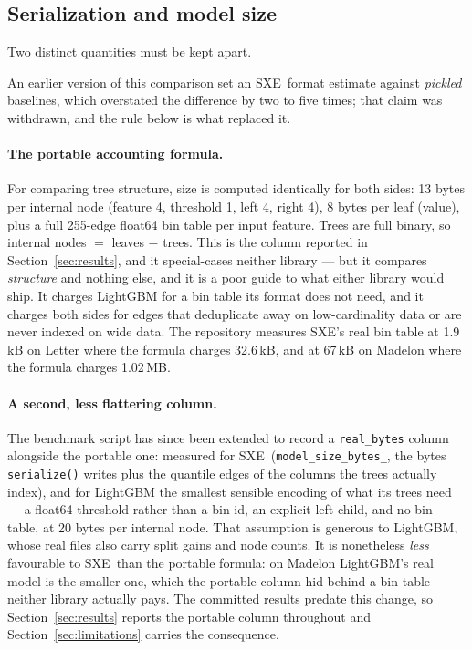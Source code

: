 \documentclass[11pt,a4paper]{article}
\newcommand{\code}[1]{\texttt{\small #1}}
\newcommand{\SXE}{\textsc{SXE}}
\theoremstyle{definition}
\begin{document}
\subsection{Serialization and model size}\label{sec:size}

Two distinct quantities must be kept apart.

An earlier version of this comparison set an \SXE\ format estimate against
\emph{pickled} baselines, which overstated the difference by two to five times;
that claim was withdrawn, and the rule below is what replaced it.

\paragraph{The portable accounting formula.} For comparing tree structure, size
is computed identically for both sides: 13 bytes per internal node (feature 4,
threshold 1, left 4, right 4), 8 bytes per leaf (value), plus a full 255-edge
float64 bin table per input feature. Trees are full binary, so internal nodes
$=$ leaves $-$ trees. This is the column reported in Section~\ref{sec:results},
and it special-cases neither library --- but it compares \emph{structure} and
nothing else, and it is a poor guide to what either library would ship. It
charges LightGBM for a bin table its format does not need, and it charges both
sides for edges that deduplicate away on low-cardinality data or are never
indexed on wide data. The repository measures \SXE's real bin table at 1.9\,kB
on Letter where the formula charges 32.6\,kB, and at 67\,kB on Madelon where the
formula charges 1.02\,MB.

\paragraph{A second, less flattering column.} The benchmark script has since
been extended to record a \code{real\_bytes} column alongside the portable one:
measured for \SXE\ (\code{model\_size\_bytes\_}, the bytes \code{serialize()}
writes plus the quantile edges of the columns the trees actually index), and for
LightGBM the smallest sensible encoding of what its trees need --- a float64
threshold rather than a bin id, an explicit left child, and no bin table, at 20
bytes per internal node. That assumption is generous to LightGBM, whose real
files also carry split gains and node counts. It is nonetheless \emph{less}
favourable to \SXE\ than the portable formula: on Madelon LightGBM's real model
is the smaller one, which the portable column hid behind a bin table neither
library actually pays. The committed results predate this change, so
Section~\ref{sec:results} reports the portable column throughout and
Section~\ref{sec:limitations} carries the consequence.
\end{document}

